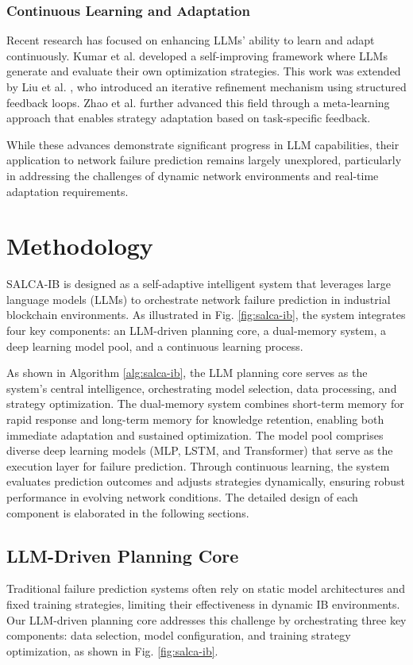 \documentclass[conference]{IEEEtran}
\begin{document}
\subsubsection{Continuous Learning and Adaptation}
Recent research has focused on enhancing LLMs' ability to learn and adapt continuously. Kumar et al. \cite{kumar2023} developed a self-improving framework where LLMs generate and evaluate their own optimization strategies. This work was extended by Liu et al. \cite{liu2023}, who introduced an iterative refinement mechanism using structured feedback loops. Zhao et al. \cite{zhao2023} further advanced this field through a meta-learning approach that enables strategy adaptation based on task-specific feedback.

While these advances demonstrate significant progress in LLM capabilities, their application to network failure prediction remains largely unexplored, particularly in addressing the challenges of dynamic network environments and real-time adaptation requirements.

\section{Methodology}

SALCA-IB is designed as a self-adaptive intelligent system that leverages large language models (LLMs) to orchestrate network failure prediction in industrial blockchain environments. As illustrated in Fig. \ref{fig:salca-ib}, the system integrates four key components: an LLM-driven planning core, a dual-memory system, a deep learning model pool, and a continuous learning process.

As shown in Algorithm \ref{alg:salca-ib}, the LLM planning core serves as the system's central intelligence, orchestrating model selection, data processing, and strategy optimization. The dual-memory system combines short-term memory for rapid response and long-term memory for knowledge retention, enabling both immediate adaptation and sustained optimization. The model pool comprises diverse deep learning models (MLP, LSTM, and Transformer) that serve as the execution layer for failure prediction. Through continuous learning, the system evaluates prediction outcomes and adjusts strategies dynamically, ensuring robust performance in evolving network conditions. The detailed design of each component is elaborated in the following sections.

\subsection{LLM-Driven Planning Core}
Traditional failure prediction systems often rely on static model architectures and fixed training strategies, limiting their effectiveness in dynamic IB environments. Our LLM-driven planning core addresses this challenge by orchestrating three key components: data selection, model configuration, and training strategy optimization, as shown in Fig. \ref{fig:salca-ib}.
\end{document}
